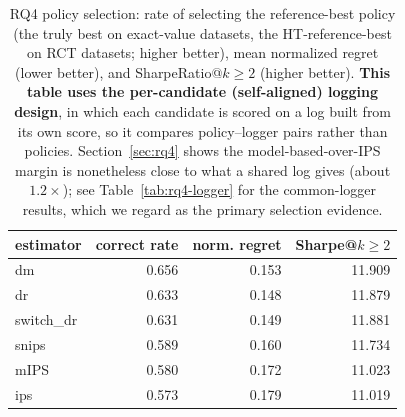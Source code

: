 \begin{table}[t]\centering
\caption{RQ4 policy selection: rate of selecting the reference-best policy (the truly best on exact-value datasets, the HT-reference-best on RCT datasets; higher better), mean normalized regret (lower better), and SharpeRatio@$k{\geq}2$ (higher better). \textbf{This table uses the per-candidate (self-aligned) logging design}, in which each candidate is scored on a log built from its own score, so it compares policy--logger pairs rather than policies. Section~\ref{sec:rq4} shows the model-based-over-IPS margin is nonetheless close to what a shared log gives (about $1.2\times$); see Table~\ref{tab:rq4-logger} for the common-logger results, which we regard as the primary selection evidence.}
\label{tab:rq4-selection}
\begin{tabular}{lrrr}
\toprule
estimator & correct rate & norm. regret & Sharpe@$k{\geq}2$ \\
\midrule
dm & 0.656 & 0.153 & 11.909 \\
dr & 0.633 & 0.148 & 11.879 \\
switch\_dr & 0.631 & 0.149 & 11.881 \\
snips & 0.589 & 0.160 & 11.734 \\
mIPS & 0.580 & 0.172 & 11.023 \\
ips & 0.573 & 0.179 & 11.019 \\
\bottomrule
\end{tabular}
\end{table}